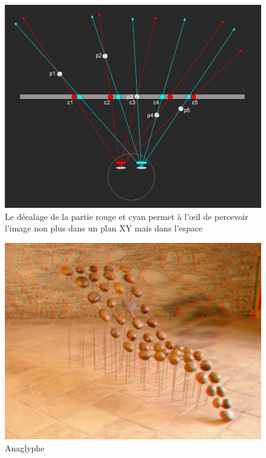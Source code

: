 \begin{figure}[h]
		\centering
		\includegraphics[scale=0.8]{anaglyph.jpg}
		\caption{\label{fig:anaglyph} Le décalage de la partie rouge et cyan permet à l’œil de percevoir l’image non plus dans un plan XY mais dans l’espace \protect \footnotemark }
\end{figure}
		
	
\begin{figure}[H]
		\centering
		\includegraphics[scale=0.3]{anaglyphex.png}
		\caption{\label{fig:anaglyphex} Anaglyphe \protect \footnotemark }
\end{figure}

